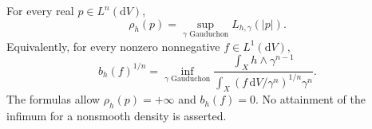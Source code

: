 \begin{theorem}\label{thm:integrable-gauduchon-formula}
For every real $p\in L^n(\mathrm{d}V)$,
\begin{equation}\label{eq:integrable-gauduchon-root}
 \rho_h(p)=\sup_{\gamma\text{ Gauduchon}}L_{h,\gamma}(|p|).
\end{equation}
Equivalently, for every nonzero nonnegative $f\in L^1(\mathrm{d}V)$,
\begin{equation}\label{eq:integrable-gauduchon-threshold}
 b_h(f)^{1/n}=
 \inf_{\gamma\text{ Gauduchon}}
 \frac{\displaystyle\int_Xh\wedge\gamma^{n-1}}
      {\displaystyle\int_X(f\,\mathrm{d}V/\gamma^n)^{1/n}\gamma^n}.
\end{equation}
The formulas allow $\rho_h(p)=+\infty$ and $b_h(f)=0$. No attainment of the infimum for a nonsmooth density is asserted.
\end{theorem}
